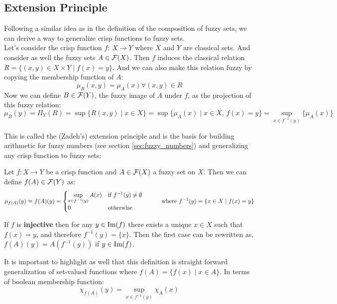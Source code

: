 \subsection{Extension Principle}

Following a similar idea as in the definition of the composition of fuzzy sets, we can derive a way to generalize crisp functions  to fuzzy sets.\\

Let's consider the crisp function $f:\,X \longrightarrow Y$ where $X$ and $Y$ are classical sets. And consider as well the fuzzy sets $A \in \mathcal{F}(X)$. Then $f$ induces the classical relation $R=\{(x,y)\in X\times Y \mid f(x)=y\}$. And we can also make this relation fuzzy by copying the membership function of $A$:
$$ \mu_R (x,y) = \mu_A (x) \forall (x,y)\in R$$
Now we can define $B\in\mathcal{F}(Y)$, the fuzzy image of $A$ under $f$, as the projection of this fuzzy relation:
$$\mu_B (y) = \Pi_Y (R) = \sup\{R(x,y)\mid x\in X\} = \sup\{\mu_A (x)\mid x\in X, \, f(x)= y\} = \sup_{x\in f^{-1}(y)}\{\mu_A(x)\}$$

This is called the (Zadeh's) extension principle and is the basis for building arithmetic for fuzzy numbers (see section \ref{sec:fuzzy_numbers}) and generalizing any crisp function to fuzzy sets: 

\begin{definition}
  Let $f: X \longrightarrow Y$ be a crisp function and $A\in \mathcal{F}(X)$ a fuzzy set on $X$. Then we can define $f(A)\in \mathcal{F}(Y)$ as:
  \[
  \mu_{f(A)}(y)\equiv f(A)(y) = 
  \begin{cases}
    \sup_{x\in f^{-1}(y)}A(x) & \textnormal{if } f^{-1}(y)\neq \emptyset\\
    0 & \textnormal{otherwise}
  \end{cases}
  \quad\quad\quad \textnormal{where } f^{-1}(y)=\{x\in X \mid f(x)=y\}
  \]
\end{definition}


\begin{remark}
  If $f$ is \textbf{injective} then for any $y \in \textnormal{Im}(f)$ there exists a unique $x \in X$ such that $f(x)=y$, and therefore $f^{-1}(y)=\{x\}$. Then the first case can be rewritten as, $f(A)(y) = A(f^{-1}(y))$ if $y \in \textnormal{Im}(f)$.
\end{remark}

It is important to highlight as well that this definition is straight forward generalization of set-valued functions where $f(A)= \{f(x)\mid x\in A\}$. In terms of boolean membership function:
$$\chi _{f(A)}(y)=\sup_{x\in f^{-1}(y)}\chi_A(x)$$

